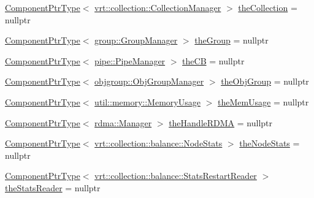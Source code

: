 \begin{DoxyCompactItemize}
\hyperlink{structvt_1_1runtime_1_1_runtime_a0893bf0a8c03b898e8ab66b52cec80ad}{Component\+Ptr\+Type}$<$ \hyperlink{structvt_1_1vrt_1_1collection_1_1_collection_manager}{vrt\+::collection\+::\+Collection\+Manager} $>$ \hyperlink{structvt_1_1runtime_1_1_runtime_a9c74bf08aceff27fa43330d3f1c8d581}{the\+Collection} = nullptr
\item 
\hyperlink{structvt_1_1runtime_1_1_runtime_a0893bf0a8c03b898e8ab66b52cec80ad}{Component\+Ptr\+Type}$<$ \hyperlink{structvt_1_1group_1_1_group_manager}{group\+::\+Group\+Manager} $>$ \hyperlink{structvt_1_1runtime_1_1_runtime_a0c446440cc8a67118f2ffd9de9f01be4}{the\+Group} = nullptr
\item 
\hyperlink{structvt_1_1runtime_1_1_runtime_a0893bf0a8c03b898e8ab66b52cec80ad}{Component\+Ptr\+Type}$<$ \hyperlink{structvt_1_1pipe_1_1_pipe_manager}{pipe\+::\+Pipe\+Manager} $>$ \hyperlink{structvt_1_1runtime_1_1_runtime_a8f4f5ea53aed7d2302bc52a39c16de0b}{the\+CB} = nullptr
\item 
\hyperlink{structvt_1_1runtime_1_1_runtime_a0893bf0a8c03b898e8ab66b52cec80ad}{Component\+Ptr\+Type}$<$ \hyperlink{structvt_1_1objgroup_1_1_obj_group_manager}{objgroup\+::\+Obj\+Group\+Manager} $>$ \hyperlink{structvt_1_1runtime_1_1_runtime_af2d01d5059edf4aed086f087e5ed1e91}{the\+Obj\+Group} = nullptr
\item 
\hyperlink{structvt_1_1runtime_1_1_runtime_a0893bf0a8c03b898e8ab66b52cec80ad}{Component\+Ptr\+Type}$<$ \hyperlink{structvt_1_1util_1_1memory_1_1_memory_usage}{util\+::memory\+::\+Memory\+Usage} $>$ \hyperlink{structvt_1_1runtime_1_1_runtime_a99d9a28de0742915ca6b25393807dd8b}{the\+Mem\+Usage} = nullptr
\item 
\hyperlink{structvt_1_1runtime_1_1_runtime_a0893bf0a8c03b898e8ab66b52cec80ad}{Component\+Ptr\+Type}$<$ \hyperlink{structvt_1_1rdma_1_1_manager}{rdma\+::\+Manager} $>$ \hyperlink{structvt_1_1runtime_1_1_runtime_a4772a2e3ae26f5dae29ea474ac0050c7}{the\+Handle\+R\+D\+MA} = nullptr
\item 
\hyperlink{structvt_1_1runtime_1_1_runtime_a0893bf0a8c03b898e8ab66b52cec80ad}{Component\+Ptr\+Type}$<$ \hyperlink{structvt_1_1vrt_1_1collection_1_1balance_1_1_node_stats}{vrt\+::collection\+::balance\+::\+Node\+Stats} $>$ \hyperlink{structvt_1_1runtime_1_1_runtime_a93ce0722815077fc9bedcd09c429b6aa}{the\+Node\+Stats} = nullptr
\item 
\hyperlink{structvt_1_1runtime_1_1_runtime_a0893bf0a8c03b898e8ab66b52cec80ad}{Component\+Ptr\+Type}$<$ \hyperlink{structvt_1_1vrt_1_1collection_1_1balance_1_1_stats_restart_reader}{vrt\+::collection\+::balance\+::\+Stats\+Restart\+Reader} $>$ \hyperlink{structvt_1_1runtime_1_1_runtime_ada50802f68607a89f9a268cf1a021926}{the\+Stats\+Reader} = nullptr

\end{DoxyCompactItemize}
